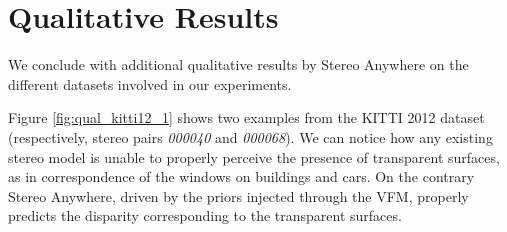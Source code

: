 \documentclass[10pt,twocolumn,letterpaper]{article}
\newcommand{\method}[0]{Stereo Anywhere\xspace}
\begin{document}
\clearpage

\section{Qualitative Results}
\label{subsec:qual}

We conclude with additional qualitative results by \method on the different datasets involved in our experiments.

Figure \ref{fig:qual_kitti12_1} shows two examples from the KITTI 2012 dataset (respectively, stereo pairs \textit{000040} and \textit{000068}). We can notice how any existing stereo model is unable to properly perceive the presence of transparent surfaces, as in correspondence of the windows on buildings and cars. On the contrary \method{}, driven by the priors injected through the VFM, properly predicts the disparity corresponding to the transparent surfaces.
\end{document}
